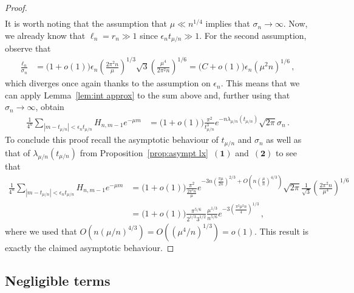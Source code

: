 \documentclass{article}
\newcommand{\1}{\mathbbm{1}}								%
\theoremstyle{definition}
\numberwithin{equation}{section}
\newcommand{\numitem}[1]{$\mathbf{(#1)}$}
\begin{document}
\begin{proof}
\begin{align*}
    \end{align*}
    It is worth noting that the assumption that $\mu\ll n^{1/4}$ implies that $\sigma_n\rightarrow\infty$.
    Now, we already know that $\ell_n=r_n\gg1$ since $\epsilon_nt_{\mu/n}\gg1$.
    For the second assumption, observe that
    \begin{align*}
        \frac{\ell_n}{\sigma_n}&=\big(1+o(1)\big)\epsilon_n\left(\frac{2\pi^2n}{\mu}\right)^{1/3}\sqrt{3}\left(\frac{\mu^4}{2\pi^2n}\right)^{1/6}=\big(C+o(1)\big)\epsilon_n(\mu^2n)^{1/6}\,,
    \end{align*}
    which diverges once again thanks to the assumption on $\epsilon_n$.
    This means that we can apply Lemma~\ref{lem:int approx} to the sum above and, further using that $\sigma_n\rightarrow\infty$, obtain
    \begin{align*}
        \frac{1}{4^n}\sum_{|m-t_{\mu/n}|<\epsilon_nt_{\mu/n}}H_{n,m-1}e^{-\mu m}&=\big(1+o(1)\big)\frac{\pi^2}{t_{\mu/n}^3}e^{-n\lambda_{\mu/n}(t_{\mu/n})}\sqrt{2\pi}\sigma_n\,.
    \end{align*}
    To conclude this proof recall the asymptotic behaviour of $t_{\mu/n}$ and $\sigma_n$ as well as that of $\lambda_{\mu/n}(t_{\mu/n})$ from Proposition~\ref{prop:asympt lx}~\numitem{1} and~\numitem{2} to see that
    \begin{align*}
        \frac{1}{4^n}\sum_{|m-t_{\mu/n}|<\epsilon_nt_{\mu/n}}H_{n,m-1}e^{-\mu m}&=\big(1+o(1)\big)\frac{\pi^2}{\frac{2\pi^2n}{\mu}}e^{-3n\left(\frac{\pi\mu}{2n}\right)^{2/3}+O\left(n\left(\frac{\mu}{n}\right)^{4/3}\right)}\sqrt{2\pi}\frac{1}{\sqrt{3}}\left(\frac{2\pi^2n}{\mu^4}\right)^{1/6}\\
        &=\big(1+o(1)\big)\frac{\pi^{5/6}}{2^{1/3}3^{1/2}}\frac{\mu^{1/3}}{n^{5/6}}e^{-3\left(\frac{\pi^2\mu^2n}{4}\right)^{1/3}}\,,
    \end{align*}
    where we used that $O(n(\mu/n)^{4/3})=O((\mu^4/n)^{1/3})=o(1)$.
    This result is exactly the claimed asymptotic behaviour.
\end{proof}

\subsection{Negligible terms}\label{sec:negligible W}
\end{document}
